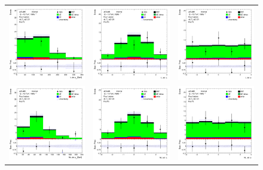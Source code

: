 \begin{figure}[htbp]
  \begin{tabular}{ccc}

    \includegraphics[width=.3\textwidth]{figures/PreFitPlots/lep4_ttZ_4T_LJet_pt.png} &
    \includegraphics[width=.3\textwidth]{figures/PreFitPlots/lep4_ttZ_4T_LJet_eta.png} &
    \includegraphics[width=.3\textwidth]{figures/PreFitPlots/lep4_ttZ_4T_LJet_phi.png} \\
    \includegraphics[width=.3\textwidth]{figures/PreFitPlots/lep4_ttZ_4T_NLJet_pt.png} &
    \includegraphics[width=.3\textwidth]{figures/PreFitPlots/lep4_ttZ_4T_NLJet_eta.png} &
    \includegraphics[width=.3\textwidth]{figures/PreFitPlots/lep4_ttZ_4T_NLJet_phi.png} \\


\end{tabular}
\end{figure}
